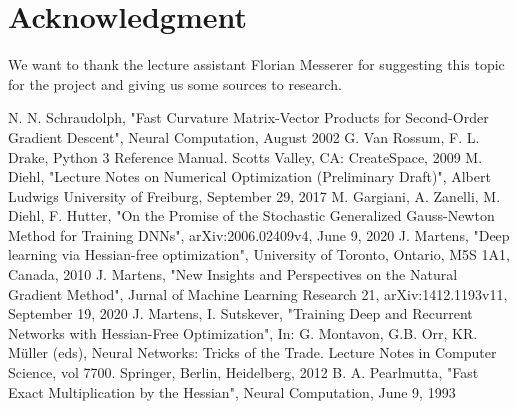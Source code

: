 \documentclass[conference]{IEEEtran}
\begin{document}
	\section*{Acknowledgment}
	\noindent
	We want to thank the lecture assistant Florian Messerer for suggesting this topic for the project and giving us some sources to research. 
	
	
	\begin{thebibliography}{00}
		 N. N. Schraudolph, "Fast Curvature Matrix-Vector Products for Second-Order
		Gradient Descent", Neural Computation, August 2002
		 G. Van Rossum, F. L. Drake, Python 3 Reference Manual. Scotts Valley, CA: CreateSpace, 2009
		 M. Diehl, "Lecture Notes on Numerical Optimization (Preliminary Draft)", Albert Ludwigs University of Freiburg, September 29, 2017	
		 M. Gargiani, A. Zanelli, M. Diehl, F. Hutter, "On the Promise of the Stochastic Generalized Gauss-Newton Method for Training DNNs",  arXiv:2006.02409v4, June 9, 2020 
		 J. Martens, "Deep learning via Hessian-free optimization", University of Toronto, Ontario, M5S 1A1, Canada, 2010
		 J. Martens, "New Insights and Perspectives on the Natural Gradient Method", Jurnal of Machine Learning Research 21, arXiv:1412.1193v11, September 19, 2020
		 J. Martens, I. Sutskever, "Training Deep and Recurrent Networks with Hessian-Free Optimization", In: G. Montavon, G.B. Orr, KR. Müller (eds), Neural Networks: Tricks of the Trade. Lecture Notes in Computer Science, vol 7700. Springer, Berlin, Heidelberg, 2012
		 B. A. Pearlmutta, "Fast Exact Multiplication by the Hessian", Neural Computation, June 9, 1993

	\end{thebibliography}
	
	
\end{document}
